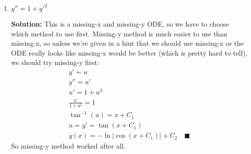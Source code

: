 \documentclass[letterpaper, fontsize=10pt]{scrartcl} %
\numberwithin{equation}{section} %
\numberwithin{figure}{section} %
\numberwithin{table}{section} %
\begin{document}
\begin{enumerate}
\begin{enumerate}[label=(\alph*)]
\item $y'' =  1 + y'^2$
\par \textbf{Solution:} This is a missing-x and missing-y ODE, so we have to choose which method to use first. Missing-y method is much easier to use than missing-x, so unless we're given in a hint that we should use missing-x or the ODE really looks like missing-x would be better (which is pretty hard to tell), we should try missing-y first:
\begin{gather*}
y' = u \\
y'' = u' \\
u' = 1 + u^2 \\
\frac{u' }{1 + u^2} = 1 \\
\tan^{-1}(u) = x + C_1 \\
u = y' = \tan(x + C_1) \\
y(x) = -\ln| \cos(x + C_1)| + C_2 \quad \blacksquare
\end{gather*}
So missing-y method worked after all. 
\end{enumerate}



\end{enumerate}
\end{document}
